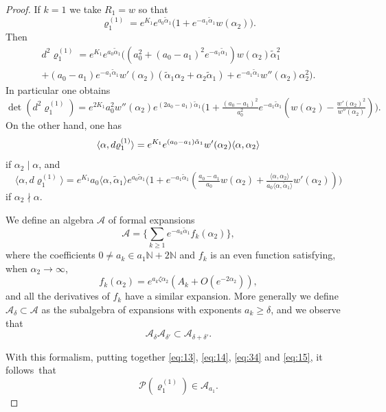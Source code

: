 \documentclass[10pt]{amsart}
\theoremstyle{plain}
\theoremstyle{definition}
\newcommand{\cA}{\mathcal{A}}
\newcommand{\ta}{\tilde \alpha}
\newcommand{\opP}{\mathcal{P}}
\newcommand{\rhoun}{\varrho^{(1)}}
\begin{document}
\begin{proof}
If $k=1$ we take $R_1=w$ so that
\[ \rhoun_1 = e^{K_1}e^{a_0 \ta_1} \big( 1 + e^{-a_1\ta_1}w(\alpha_2) \big). \]
Then
\begin{multline*}
d^2\rhoun_1 = e^{K_1}e^{a_0 \ta_1} \big( (a_0^2+(a_0-a_1)^2e^{-a_1\ta_1})w(\alpha_2) \ta_1^2 \\  + (a_0-a_1) e^{-a_1\ta_1}w'(\alpha_2) (\ta_1\alpha_2+\alpha_2\ta_1) +e^{-a_1\ta_1}w''(\alpha_2) \alpha_2^2 \big).
\end{multline*}
In particular one obtains
\begin{equation}
\label{eq:13}
\det(d^2\rhoun_1) = e^{2K_1}a_0^2w''(\alpha_2)e^{(2a_0-a_1)\ta_1} \big(1 + \tfrac{(a_0-a_1)^2}{a_0^2}e^{-a_1\ta_1} ( w(\alpha_2)-\tfrac{w'(\alpha_2)^2}{w''(\alpha_2)}) \big).
\end{equation}
On the other hand, one has
\begin{equation}
\label{eq:14}
\langle\alpha,d\rhoun_1\rangle = e^{K_1}e^{(a_0-a_1)\ta_1} w'(\alpha_2) \langle\alpha,\alpha_2\rangle \\
\end{equation}
if $\alpha_2 \mid \alpha$, and
\begin{equation}\label{eq:34}
\langle\alpha,d\rhoun_1\rangle = e^{K_1}a_0\langle\alpha,\ta_1\rangle e^{a_0\ta_1} \big( 1 + e^{-a_1\ta_1} (\tfrac{a_0-a_1}{a_0}w(\alpha_2) + \tfrac{\langle\alpha,\alpha_2\rangle}{a_0\langle\alpha,\ta_1\rangle} w'(\alpha_2)) \big)
\end{equation}
if $\alpha_2 \nmid \alpha$.

We define an algebra $\cA$ of formal expansions
\[ \cA = \biggl\{ \sum_{k\geq 1} e^{-a_k\ta_1}f_k(\alpha_2) \biggr\}, \]
where the coefficients $0\neq a_k\in a_1\mathbb{N}+2\mathbb{N}$ and $f_k$ is an even function satisfying, when $\alpha_2\to\infty$,
\[ f_k(\alpha_2) = e^{a_k\zeta\alpha_2} (A_k + O(e^{-2\alpha_2})), \]
and all the derivatives of $f_k$ have a similar expansion. More generally we define $\cA_\delta\subset \cA$ as the subalgebra of expansions with exponents $a_k\geq\delta$, and we observe that
\[ \cA_\delta \cA_{\delta'} \subset \cA_{\delta+\delta'}. \]

With this formalism, putting together \eqref{eq:13}, \eqref{eq:14}, \eqref{eq:34} and \eqref{eq:15}, it follows~that
\begin{equation}
\label{eq:16}
\opP(\rhoun_1) \in \cA_{a_1}.
\end{equation}


\end{proof}
\end{document}

